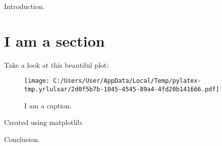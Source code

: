 \documentclass{article}%
\begin{document}
%
\normalsize%
Introduction.%
\section{I am a section}%
\label{sec:Iamasection}%
Take a look at this beautiful plot:%


\begin{figure}[htbp]%
\centering%
\texttt{[image: C:/Users/User/AppData/Local/Temp/pylatex-tmp.yrlulxar/2d0f5b7b-1045-4545-89a4-4fd20b141666.pdf]}%
\caption{I am a caption.}%
\end{figure}

%
Created using matplotlib.

%
Conclusion.%
\end{document}
